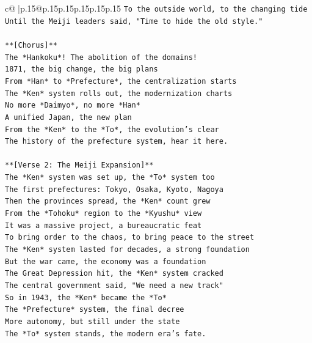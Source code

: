 \documentclass{article}
\begin{document}
{\begin{supertabular}{c@{$\;$}|p{.15\linewidth}@{}p{.15\linewidth}p{.15\linewidth}p{.15\linewidth}p{.15\linewidth}p{.15\linewidth}}
{{{\texttt{To the outside world, to the changing tide} \\
\texttt{Until the Meiji leaders said, "Time to hide the old style."} \\
\\ 
\texttt{**{[}Chorus{]}**} \\
\texttt{The *Hankoku*! The abolition of the domains!} \\
\texttt{1871, the big change, the big plans} \\
\texttt{From *Han* to *Prefecture*, the centralization starts} \\
\texttt{The *Ken* system rolls out, the modernization charts} \\
\texttt{No more *Daimyo*, no more *Han*} \\
\texttt{A unified Japan, the new plan} \\
\texttt{From the *Ken* to the *To*, the evolution's clear} \\
\texttt{The history of the prefecture system, hear it here.} \\
\\ 
\texttt{**{[}Verse 2: The Meiji Expansion{]}**} \\
\texttt{The *Ken* system was set up, the *To* system too} \\
\texttt{The first prefectures: Tokyo, Osaka, Kyoto, Nagoya} \\
\texttt{Then the provinces spread, the *Ken* count grew} \\
\texttt{From the *Tohoku* region to the *Kyushu* view} \\
\texttt{It was a massive project, a bureaucratic feat} \\
\texttt{To bring order to the chaos, to bring peace to the street} \\
\texttt{The *Ken* system lasted for decades, a strong foundation} \\
\texttt{But the war came, the economy was a foundation} \\
\texttt{The Great Depression hit, the *Ken* system cracked} \\
\texttt{The central government said, "We need a new track"} \\
\texttt{So in 1943, the *Ken* became the *To*} \\
\texttt{The *Prefecture* system, the final decree} \\
\texttt{More autonomy, but still under the state} \\
\texttt{The *To* system stands, the modern era's fate.} \\
}}}
\end{supertabular}}
\end{document}
